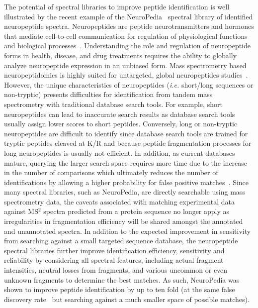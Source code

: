 \documentclass[8.5pt,twoside,twocolumn]{article}
\begin{document}
The potential of spectral libraries to improve peptide identification is well illustrated by the recent example of the NeuroPedia~\cite{kim11neuropedia} spectral library of identified neuropeptide spectra. Neuropeptides are peptide neurotransmitters and hormones that mediate cell-to-cell communication for regulation of physiological functions and biological processes~\cite{hook10}. Understanding the role and regulation of neuropeptide forms in health, disease, and drug treatments requires the ability to globally analyze neuropeptide expression in an unbiased form. Mass spectrometry based neuropeptidomics is highly suited for untargeted, global neuropeptides studies~\cite{bora08,fricker07,hook10,li08,svensson07}. However, the unique characteristics  of neuropeptides ({\em i.e.} short/long sequences or non-tryptic) presents difficulties for identification from tandem mass spectrometry with traditional database search tools. For example, short neuropeptides can lead to inaccurate search results as database search tools usually assign lower scores to short peptides. Conversely, long or non-tryptic neuropeptides are difficult to identify since database search tools are trained for tryptic peptides cleaved at K/R and because peptide fragmentation processes for long neuropeptides is usually not efficient. In addition, as current databases mature, querying the larger search space requires more time due to the increase in the number of comparisons which ultimately reduces the number of identifications by allowing a higher probability for false positive matches~\cite{nesvizhskii10}. Since many spectral libraries, such as NeuroPedia, are directly searchable using mass spectrometry data, the caveats associated with matching experimental data against MS$^2$ spectra predicted from a protein sequence no longer apply as irregularities in fragmentation efficiency will be shared amongst the annotated and unannotated spectra. In addition to the expected improvement in sensitivity from searching against a small targeted sequence database, the neuropeptide spectral libraries further improve identification efficiency, sensitivity and reliability by considering all spectral features, including actual fragment intensities, neutral losses from fragments, and various uncommon or even unknown fragments to determine the best matches. As such, NeuroPedia was shown to improve peptide identification by up to ten fold (at the same false discovery rate~\cite{elias07,lam10,nesvizhskii10} but searching against a much smaller space of possible matches).
\end{document}
